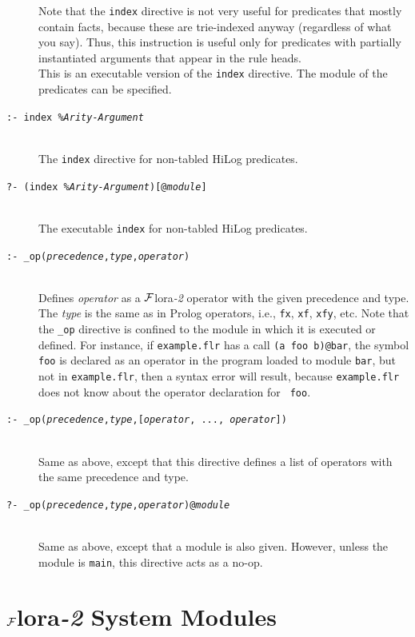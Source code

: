 \documentclass[11pt]{article}
\newcommand{\FLORA}{{\mbox{\sc ${\cal F}${lora}\rm\emph{-2}}}\xspace}
\begin{document}
\begin{description}
  Note that the {\tt index} directive is not very useful for predicates
  that mostly contain facts, because these are trie-indexed anyway
  (regardless of what you say). Thus, this instruction is useful only for
  predicates with partially instantiated arguments that appear in the rule
  heads.
~~~  \\
  This is an executable version of the {\tt index} directive.  The
  module of the predicates can be specified.
\item[{\tt :- index \emph{\%Arity-Argument} }]
~~~  \\
  The {\tt index} directive for non-tabled HiLog predicates.
\item[{\tt ?- (index \emph{\%Arity-Argument})[@\emph{module}] }]
~~~  \\
  The executable {\tt index} for non-tabled HiLog predicates.

\item[{\tt :-  \_op({\it precedence},{\it type},{\it operator})}]
 ~~~ \\
  Defines \emph{operator} as a \FLORA operator with the given precedence
  and type. The \emph{type} is the same as in Prolog operators, i.e.,
  {\tt fx}, {\tt xf}, {\tt xfy}, etc.
  Note that the {\tt \_op} directive is confined to
  the module in which it is executed or defined. For instance, if
  {\tt example.flr} has a call {\tt (a foo b)@bar}, the symbol {\tt foo} is
  declared as an operator in the program loaded to module {\tt bar}, but not in
  {\tt example.flr}, then a syntax error will result, because 
   {\tt example.flr} does not know about the operator declaration for {\tt
  foo}.
\item[{\tt :-  \_op({\it precedence},{\it type},[{\it operator}, ..., {\it operator}])}]
~~~  \\
  Same as above, except that this directive defines a list of operators
  with the same precedence and type.
\item[{\tt ?-  \_op({\it precedence},{\it type},{\it operator})@\emph{module}}]
 ~~~ \\
  Same as above, except that a module is also given. However, unless the
  module is {\tt main}, this directive acts as a no-op.
\end{description}


\section{\FLORA System Modules}\label{sec-service-libs}
\end{document}
